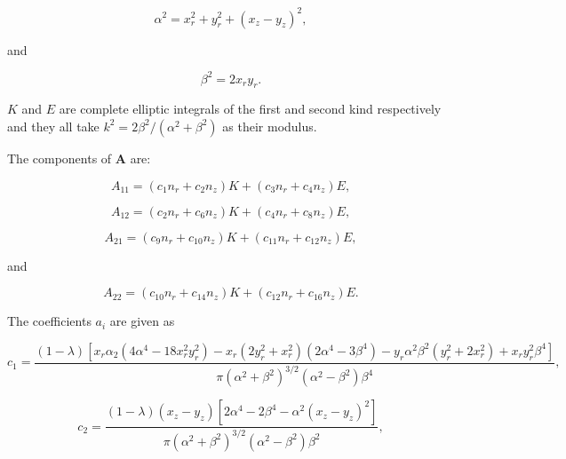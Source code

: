 \documentclass[12pt]{article}
\begin{document}
\begin{equation}
\label{equ:alpha_def}
\alpha^{2} = x_{r}^{2} + y_{r}^{2} + (x_{z} - y_{z})^{2},
\end{equation}

and 

\begin{equation}
\label{equ:beta_def}
\beta^{2} = 2 x_{r} y_{r}.
\end{equation}


$K$ and $E$ are complete elliptic integrals of the first and second kind respectively and they all take $k^{2} = 2 \beta^{2} / (\alpha^{2} + \beta^{2})$ as their modulus. 

The components of $\boldsymbol{A}$ are:

\begin{equation}
\label{equ:A11_comp}
A_{11} = (c_{1} n_{r} + c_{2} n_{z})K + (c_{3} n_{r} + c_{4} n_{z})E,
\end{equation}

\begin{equation}
\label{equ:A12_comp}
A_{12} = (c_{2} n_{r} + c_{6} n_{z})K + (c_{4} n_{r} + c_{8} n_{z})E,
\end{equation}

\begin{equation}
\label{equ:A21_comp}
A_{21} = (c_{9} n_{r} + c_{10} n_{z})K + (c_{11} n_{r} + c_{12} n_{z})E,
\end{equation}

and 

\begin{equation}
\label{equ:A22_comp}
A_{22} = (c_{10} n_{r} + c_{14} n_{z})K + (c_{12} n_{r} + c_{16} n_{z})E.
\end{equation}

The coefficients $a_{i}$ are given as

\begin{equation}
\label{equ:coeff_a1}
c_{1} = \frac{(1 - \lambda) [x_{r} \alpha_{2} (4 \alpha^{4} - 18 x_{r}^{2} y_{r}^{2}) - x_{r} (2 y_{r}^{2} + x_{r}^{2}) (2 \alpha^{4} - 3 \beta^{4}) - y_{r} \alpha^{2} \beta^{2} (y_{r}^{2} + 2 x_{r}^{2}) + x_{r} y_{r}^{2} \beta^{4}]}{\pi (\alpha^{2} + \beta^{2})^{3/2} (\alpha^{2} - \beta^{2}) \beta^{4}},
\end{equation}

\begin{equation}
\label{equ:equ:coeff_a2}
c_{2} = \frac{(1 - \lambda) (x_{z} - y_{z}) [2 \alpha^{4} - 2 \beta^{4} - \alpha^{2} (x_{z} - y_{z})^{2}]}{\pi (\alpha^{2} + \beta^{2})^{3/2} (\alpha^{2} - \beta^{2}) \beta^{2}},
\end{equation}
\end{document}
